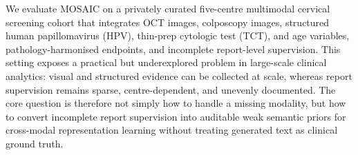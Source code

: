 \documentclass[11pt, a4paper]{article}
\theoremstyle{plain}
\theoremstyle{definition}
\begin{document}

We evaluate MOSAIC on a privately curated five-centre multimodal cervical screening cohort that integrates OCT images, colposcopy images, structured human papillomavirus (HPV), thin-prep cytologic test (TCT), and age variables, pathology-harmonised endpoints, and incomplete report-level supervision. This setting exposes a practical but underexplored problem in large-scale clinical analytics: visual and structured evidence can be collected at scale, whereas report supervision remains sparse, centre-dependent, and unevenly documented. The core question is therefore not simply how to handle a missing modality, but how to convert incomplete report supervision into auditable weak semantic priors for cross-modal representation learning without treating generated text as clinical ground truth.
\end{document}
